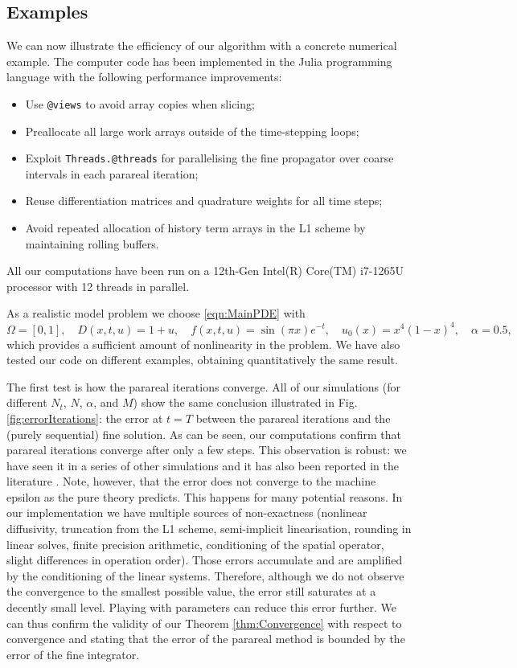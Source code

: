 \documentclass[12pt,a4paper]{article}
\begin{document}
\subsection{Examples}
We can now illustrate the efficiency of our algorithm with a concrete numerical example. The computer code has been implemented in the Julia programming language with the following performance improvements:
\begin{itemize}
	\item Use \texttt{@views} to avoid array copies when slicing;
	\item Preallocate all large work arrays outside of the time-stepping loops;
	\item Exploit \texttt{Threads.@threads} for parallelising the fine propagator over coarse intervals in each parareal iteration;
	\item Reuse differentiation matrices and quadrature weights for all time steps;
	\item Avoid repeated allocation of history term arrays in the L1 scheme by maintaining rolling buffers.
\end{itemize}
All our computations have been run on a 12th-Gen Intel(R) Core(TM) i7-1265U processor with 12 threads in parallel. 

As a realistic model problem we choose \eqref{eqn:MainPDE} with
\begin{equation}
	\Omega = [0,1], \quad D(x,t,u) = 1 + u, \quad f(x,t,u) = \sin(\pi x) e^{-t}, \quad u_0(x) = x^4(1-x)^4, \quad \alpha = 0.5,
\end{equation}
which provides a sufficient amount of nonlinearity in the problem. We have also tested our code on different examples, obtaining quantitatively the same result. 

The first test is how the parareal iterations converge. All of our simulations (for different $N_t$, $N$, $\alpha$, and $M$) show the same conclusion illustrated in Fig. \ref{fig:errorIterations}: the error at $t = T$ between the parareal iterations and the (purely sequential) fine solution. As can be seen, our computations confirm that parareal iterations converge after only a few steps. This observation is robust: we have seen it in a series of other simulations and it has also been reported in the literature \cite{gander2025time}. Note, however, that the error does not converge to the machine epsilon as the pure theory predicts. This happens for many potential reasons. In our implementation we have multiple sources of non-exactness (nonlinear diffusivity, truncation from the L1 scheme, semi-implicit linearisation, rounding in linear solves, finite precision arithmetic, conditioning of the spatial operator, slight differences in operation order). Those errors accumulate and are amplified by the conditioning of the linear systems. Therefore, although we do not observe the convergence to the smallest possible value, the error still saturates at a decently small level. Playing with parameters can reduce this error further. We can thus confirm the validity of our Theorem \ref{thm:Convergence} with respect to convergence and stating that the error of the parareal method is bounded by the error of the fine integrator. 
\end{document}
